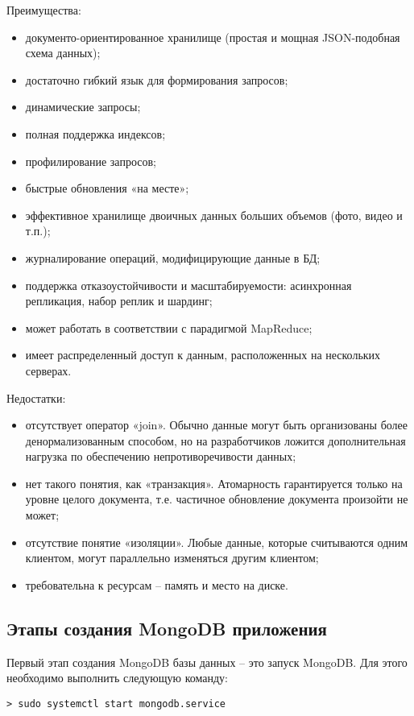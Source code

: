 Преимущества:
\begin{itemize}
	\item документо-ориентированное хранилище (простая и мощная JSON-подобная схема данных);
	\item достаточно гибкий язык для формирования запросов;
	\item динамические запросы;
	\item полная поддержка индексов;
	\item профилирование запросов;
	\item быстрые обновления «на месте»;
	\item эффективное хранилище двоичных данных больших объемов (фото, видео и т.п.);
	\item журналирование операций, модифицирующие данные в БД;
	\item поддержка отказоустойчивости и масштабируемости: асинхронная репликация, набор реплик и шардинг;
	\item может работать в соответствии с парадигмой MapReduce;
	\item имеет распределенный доступ к данным, расположенных на нескольких серверах.
\end{itemize}

Недостатки: 
\begin{itemize}
	\item отсутствует оператор «join». Обычно данные могут быть организованы более денормализованным способом, но на разработчиков ложится дополнительная нагрузка по обеспечению непротиворечивости данных;
	\item нет такого понятия, как «транзакция». Атомарность гарантируется только на уровне целого документа, т.е. частичное обновление документа произойти не может;
	\item отсутствие понятие «изоляции». Любые данные, которые считываются одним клиентом, могут параллельно изменяться другим клиентом;
	\item требовательна к ресурсам – память и место на диске.
\end{itemize}

\subsection{Этапы создания MongoDB приложения}
Первый этап создания MongoDB базы данных – это запуск MongoDB. Для этого необходимо выполнить следующую команду:
\begin{lstlisting}
> sudo systemctl start mongodb.service
\end{lstlisting}

